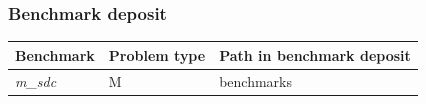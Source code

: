 \subsubsection*{Benchmark deposit}
\begin{tabular}{|l|l|l|}
  \hline
  Benchmark & Problem type & Path in benchmark deposit \\
  \hline
 \emph{m\_sdc} & M & benchmarks\verb \M\ \\
  \hline
\end{tabular}

